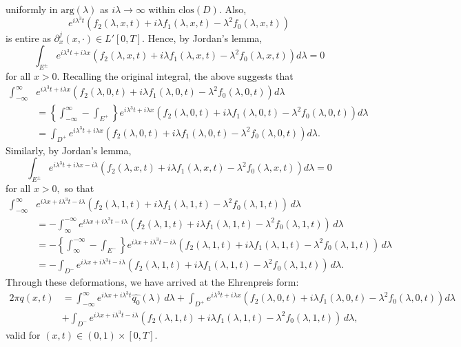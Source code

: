 uniformly in $\mathrm{arg}(\lambda)$ as $i\lambda \to \infty$ within $\mathrm{clos}(D)$. Also, \[e^{i \lambda^3 t}\left(f_2(\lambda, x, t) + i \lambda f_1(\lambda, x, t) - \lambda^2 f_0(\lambda, x, t)\right)\]
is entire as $\partial_x^j(x,\cdot) \in L'[0,T]$. Hence, by Jordan's lemma,
\[\int_{E^\pm} e^{i \lambda^3 t+i\lambda x}\left(f_2(\lambda, x, t) + i \lambda f_1(\lambda, x, t) - \lambda^2 f_0(\lambda, x, t)\right)d\lambda = 0\]
for all $x > 0$.
Recalling the original integral, the above suggests that 
\begin{align*}
    \int_{-\infty}^{\infty} &e^{i \lambda^3 t+i\lambda x}\left(f_2(\lambda, 0, t) + i \lambda f_1(\lambda, 0, t) - \lambda^2 f_0(\lambda, 0, t)\right)d\lambda \\
    &= \left\{ \int_{-\infty}^{\infty} - \int_{E^+} \right\} e^{i \lambda^3 t+i\lambda x}\left(f_2(\lambda, 0, t) + i \lambda f_1(\lambda, 0, t) - \lambda^2 f_0(\lambda, 0, t)\right)d\lambda \\
    &= \int_{D^+} e^{i \lambda^3 t+i\lambda x}\left(f_2(\lambda, 0, t) + i \lambda f_1(\lambda, 0, t) - \lambda^2 f_0(\lambda, 0, t)\right)d\lambda.
\end{align*}
Similarly, by Jordan's lemma, 
\[\int_{E^\pm} e^{i \lambda^3 t+i\lambda x - i \lambda}\left(f_2(\lambda, x, t) + i \lambda f_1(\lambda, x, t) - \lambda^2 f_0(\lambda, x, t)\right)d\lambda = 0\]
for all $x > 0,$ so that 
\begin{align*}
    \int_{-\infty}^\infty &e^{i\lambda x+i \lambda^3 t-i\lambda} \left(f_2(\lambda, 1, t) + i \lambda f_1(\lambda, 1, t) - \lambda^2 f_0(\lambda, 1, t)\right)\,d\lambda \\
    &= - \int_{\infty}^{-\infty} e^{i\lambda x+i \lambda^3 t-i\lambda} \left(f_2(\lambda, 1, t) + i \lambda f_1(\lambda, 1, t) - \lambda^2 f_0(\lambda, 1, t)\right)\,d\lambda \\
    &= - \left\{ \int_{\infty}^{-\infty} - \int_{E^-} \right\} e^{i\lambda x+i \lambda^3 t-i\lambda} \left(f_2(\lambda, 1, t) + i \lambda f_1(\lambda, 1, t) - \lambda^2 f_0(\lambda, 1, t)\right)\,d\lambda \\
    &= -\int_{D^-} e^{i\lambda x+i \lambda^3 t-i\lambda} \left(f_2(\lambda, 1, t) + i \lambda f_1(\lambda, 1, t) - \lambda^2 f_0(\lambda, 1, t)\right)\,d\lambda.
\end{align*}
Through these deformations, we have arrived at the Ehrenpreis form:
\begin{equation*}\label{EFt}
\begin{aligned}
2\pi q(x, t) &= \int_{-\infty}^\infty e^{i\lambda x + i \lambda^3 t}\hat{q_0}(\lambda)\,d\lambda + \int_{D^+} e^{i \lambda^3 t+i\lambda x}\left(f_2(\lambda, 0, t) + i \lambda f_1(\lambda, 0, t) - \lambda^2 f_0(\lambda, 0, t)\right)d\lambda \\
&+\int_{D^-} e^{i\lambda x+i \lambda^3 t-i\lambda} \left(f_2(\lambda, 1, t) + i \lambda f_1(\lambda, 1, t) - \lambda^2 f_0(\lambda, 1, t)\right)\,d\lambda,
\end{aligned}\tag{EF$t$}
\end{equation*}
valid for $(x, t) \in (0,1) \times[0,T].$

